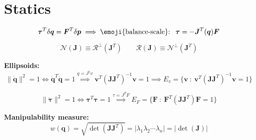 \vspace*{-17pt}
\section{Statics}
\vspace*{-5pt}

$$
\bm{\tau}^T\delta \bm{q} = \bm{F}^T\delta\bm{p}
\implies
\text{\emoji{balance-scale}: } \ 
\bm{\tau} = -\bm{J}^T(\bm{q})\bm{F}
$$

$$
\mathcal{N}(\bm{J}) \equiv \mathcal{R}^\perp(\bm{J}^T)
\qquad
\mathcal{R}(\bm{J}) \equiv \mathcal{N}^\perp(\bm{J}^T)
$$

\textbf{Ellipsoids: }
$$
\|\bm{\dot{q}}\|^2 = 1 \iff \bm{\dot{q}}^T\bm{\dot{q}} = 1
\overset{\dot{q} = J^\dagger v}{\implies}
\bm{v}^T (\bm{J}\bm{J}^T)^{-1}\bm{v} = 1
\implies
E_v = \{\bm{v} \ : \ \bm{v}^T (\bm{J}\bm{J}^T)^{-1}\bm{v} = 1 \}
$$

$$
\|\bm{\dot{\tau}}\|^2 = 1 \iff \bm{\tau}^T\bm{\tau} = 1
\overset{\tau = J^T F}{\implies}
E_F = \{\bm{F} \ : \ \bm{F}^T (\bm{J}\bm{J}^T)\bm{F} = 1 \}
$$

\textbf{Manipulability measure: }
$$
w(\bm{q}) = \sqrt{\det(\bm{J}\bm{J}^T)}
=
|\lambda_1\lambda_2 \cdots \lambda_n|
=
|\det(\bm{J})|
$$
